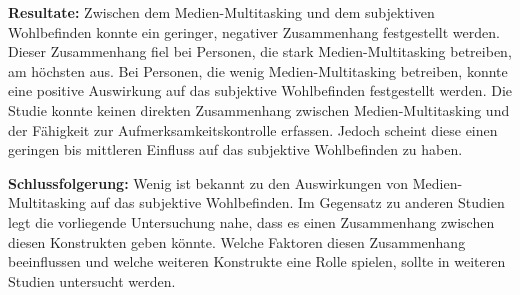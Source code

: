 \textbf{Resultate:} Zwischen dem Medien-Multitasking und dem subjektiven Wohlbefinden konnte ein geringer, negativer Zusammenhang festgestellt werden. Dieser Zusammenhang fiel bei Personen, die stark Medien-Multitasking betreiben, am höchsten  aus. Bei Personen, die wenig Medien-Multitasking betreiben, konnte eine positive Auswirkung auf das subjektive Wohlbefinden festgestellt werden. Die Studie konnte keinen direkten Zusammenhang zwischen Medien-Multitasking und der Fähigkeit zur Aufmerksamkeitskontrolle erfassen. Jedoch scheint diese einen geringen bis mittleren Einfluss auf das subjektive Wohlbefinden zu haben.
\par 
\textbf{Schlussfolgerung:} Wenig ist bekannt zu den Auswirkungen von Medien-Multitasking auf das subjektive Wohlbefinden. Im Gegensatz zu anderen Studien legt die vorliegende Untersuchung nahe, dass es einen Zusammenhang zwischen diesen Konstrukten geben könnte. Welche Faktoren diesen Zusammenhang beeinflussen und welche weiteren Konstrukte eine Rolle spielen, sollte in weiteren Studien untersucht werden. 



